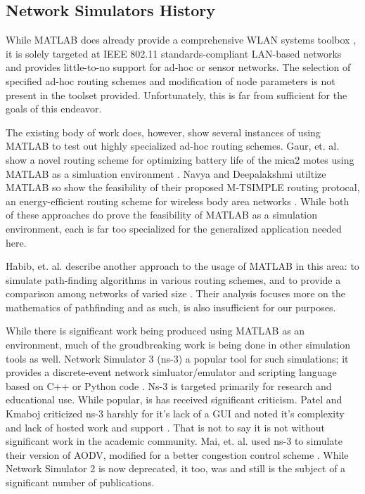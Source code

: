 \documentclass[conference]{IEEEtran}
\begin{document}
\subsection{Network Simulators History}

While MATLAB does already provide a comprehensive WLAN systems toolbox \cite{matlab_wlan_toolbox}, it is solely targeted at IEEE 802.11 standards-compliant LAN-based networks and provides little-to-no support for ad-hoc or sensor networks. The selection of specified ad-hoc routing schemes and modification of node parameters is not present in the toolset provided. Unfortunately, this is far from sufficient for the goals of this endeavor.

The existing body of work does, however, show several instances of using MATLAB to test out highly specialized ad-hoc routing schemes. Gaur, et. al. show a novel routing scheme for optimizing battery life of the mica2 motes using MATLAB as a simluation environment \cite{matlab_ex_mica2}. Navya and Deepalakshmi utiltize MATLAB so show the feasibility of their proposed M-TSIMPLE routing protocal, an energy-efficient routing scheme for wireless body area networks \cite{matlab_ex_mtsimple}.  While both of these approaches do prove the feasibility of MATLAB as a simulation environment, each is far too specialized for the generalized application needed here.

Habib, et. al. describe another approach to the usage of MATLAB in this area: to simulate path-finding algorithms in various routing schemes, and to provide a comparison among networks of varied size \cite{matlab_ex_pathfinding}. Their analysis focuses more on the mathematics of pathfinding and as such, is also insufficient for our purposes.

While there is significant work being produced using MATLAB as an environment, much of the groudbreaking work is being done in other simulation tools as well. Network Simulator 3 (ns-3) a popular tool for such simulations; it provides a discrete-event network simluator/emulator and scripting language based on C++ or Python code \cite{ns3}. Ns-3 is targeted primarily for research and educational use. While popular, is has received significant criticism. Patel and Kmaboj criticized ns-3 harshly for it's lack of a GUI and noted it's complexity and lack of hosted work and support \cite{ns3_criticism}. That is not to say it is not without significant work in the academic community. Mai, et. al. used ns-3 to simulate their version of AODV, modified for a better congestion control scheme \cite{aodv_in_ns3}. While Network Simulator 2 \cite{ns2} is now deprecated, it too, was and still is the subject of a significant number of publications.
\end{document}
